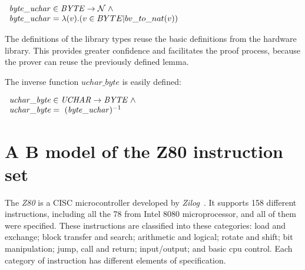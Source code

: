 \documentclass[11pt]{article} %
\begin{document}
$
\begin{array}{l}
\mathit{byte\_uchar} \in \mathit{BYTE} \fun \nat \land \\
\mathit{byte\_uchar} = \lambda (v) . ( v \in BYTE | bv\_to\_nat(v) )
\end{array}
$

The definitions of the library types reuse the basic definitions from the hardware library. This provides
greater confidence and facilitates the proof process, because the prover can reuse the previously defined
lemma.


The inverse function $\mathit{uchar\_byte}$ is easily defined:

$
\begin{array}{l}
\mathit{uchar\_byte} \in \mathit{UCHAR}  \rightarrow  \mathit{BYTE}  \mathrel{\wedge} \\
   \mathit{uchar\_byte} = \ (\mathit{byte\_uchar}) ^{-1}
\end{array}
$

%



\section{A B model of the Z80 instruction set}
\label{sec:z80}

The \textit{Z80} is a CISC microcontroller developed by \textit{Zilog}~\cite{Z80_manual}. It supports 158
different instructions, including all the 78 from Intel 8080 microprocessor, and all of them were
specified. These instructions are classified into these categories: load and exchange; block transfer and
search; arithmetic and logical; rotate and shift; bit manipulation; jump, call and return; input/output;
and basic cpu control. Each category of instruction has different elements of
specification.
\end{document}
